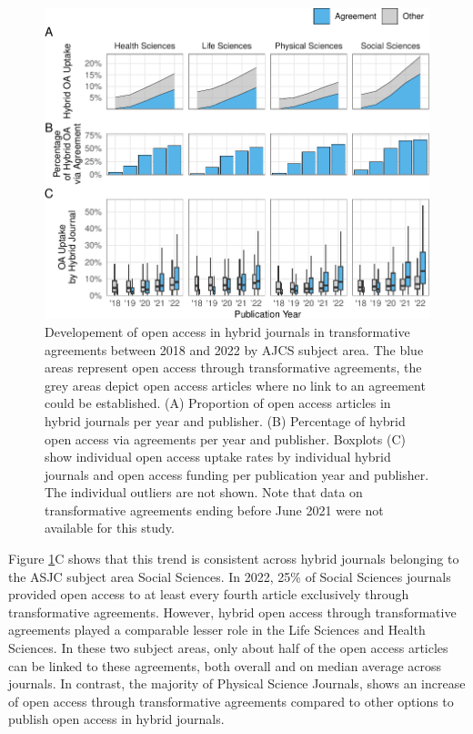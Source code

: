 \documentclass[a4paper,man,floatsintext,longtable,noextraspace,12pt]{apa6}
\begin{document}
\begin{figure}[ht!]

{\centering \includegraphics[width=0.99\linewidth,]{fig/subject_panel-1} 

}

\caption{Developement of open access in hybrid journals in transformative agreements between 2018 and 2022 by AJCS subject area. The blue areas represent open access through transformative agreements, the grey areas depict open access articles where no link to an agreement could be established. (A) Proportion of open access articles in hybrid journals per year and publisher. (B) Percentage of hybrid open access via agreements per year and publisher. Boxplots (C) show individual open access uptake rates by individual hybrid journals and open access funding per publication year and publisher. The individual outliers are not shown. Note that data on transformative agreements ending before June 2021 were not available for this study.}\label{fig:subject_panel}
\end{figure}

Figure \ref{fig:subject_panel}C shows that this trend is consistent
across hybrid journals belonging to the ASJC subject area Social
Sciences. In 2022, 25\% of Social Sciences journals provided open access
to at least every fourth article exclusively through transformative
agreements. However, hybrid open access through transformative
agreements played a comparable lesser role in the Life Sciences and
Health Sciences. In these two subject areas, only about half of the open
access articles can be linked to these agreements, both overall and on
median average across journals. In contrast, the majority of Physical
Science Journals, shows an increase of open access through
transformative agreements compared to other options to publish open
access in hybrid journals.
\end{document}
